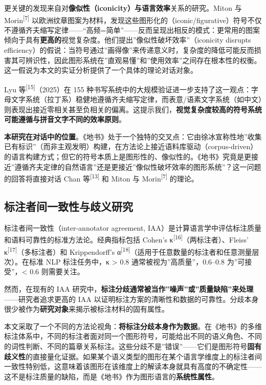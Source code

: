 \documentclass[12pt,a4paper,UTF8,fontset=founder]{ctexart}
\begin{document}
更关键的发现来自对\textbf{像似性（iconicity）与语言效率}关系的研究。Miton 与 Morin\textsuperscript{{[}7{]}} 以欧洲纹章图案为材料，发现这些图形化的（iconic/figurative）符号不仅不遵循齐夫缩写定律------``高频=简单''------反而呈现出相反的模式：更常用的图案倾向于具有\textbf{更高的}视觉复杂度。他们提出''像似性破坏效率''（iconicity disrupts efficiency）的假说：当符号通过''画得像''来传递意义时，复杂度的降低可能反而损害其可辨识性，因此图形系统在''直观易懂''和''使用效率''之间存在根本性的权衡。这一假说为本文的实证分析提供了一个具体的理论对话对象。

Lyu 等\textsuperscript{{[}15{]}}（2025）在 155 种书写系统中的大规模验证进一步支持了这一观点：字母文字系统（拉丁系）稳健地遵循齐夫缩写定律，而表意/语素文字系统（如中文）则表现出接近零相关甚至负相关的偏离。这提示我们，\textbf{视觉复杂度较高的符号系统可能遵循与拼音文字不同的效率原则}。

\textbf{本研究在对话中的位置}。《地书》处于一个独特的交叉点：它由徐冰宣称性地''收集已有标识''（而非主观发明）构建，在方法论上接近语料库驱动（corpus-driven）的语言构建方式；但它的符号本质上是图形性的、像似性的。《地书》究竟是更接近''遵循齐夫定律的自然语言''还是更接近''像似性破坏效率的图形系统''？这一问题的回答将直接对话 Chan 等\textsuperscript{{[}13{]}} 和 Miton 与 Morin\textsuperscript{{[}7{]}} 的理论。

\subsection{标注者间一致性与歧义研究}\label{ux6807ux6ce8ux8005ux95f4ux4e00ux81f4ux6027ux4e0eux6b67ux4e49ux7814ux7a76}

标注者间一致性（inter-annotator agreement, IAA）是计算语言学中评估标注质量和语料可靠性的标准方法论。经典指标包括 Cohen's κ\textsuperscript{{[}16{]}}（两标注者）、Fleiss' κ\textsuperscript{{[}17{]}}（多标注者）和 Krippendorff's α\textsuperscript{{[}18{]}}（适用于任意数量的标注者和任意测量层次）。在标准 NLP 标注任务中，κ \textgreater{} $0.8$ 通常被视为''高质量''，$0.6$--$0.8$ 为''可接受''，\textless{} $0.6$ 则需要关注。

然而，在现有的 IAA 研究中，\textbf{标注分歧通常被当作''噪声''或''质量缺陷''来处理}------研究者追求更高的 IAA 以证明标注方案的清晰性和数据的可靠性。分歧本身很少被作为\textbf{研究对象}来揭示被标注材料的固有属性。

本文采取了一个不同的方法论视角：\textbf{将标注分歧本身作为数据}。在《地书》的多维标注体系中，不同的标注者面对同一个图形符号，可能给出不同的语义角色、不同的词性判断、不同的篇章关系标注。这些分歧不是''错误''------它们是图形符号\textbf{固有歧义性}的直接量化证据。如果某个语义类型的图形在某个语言学维度上的标注者间一致性特别低，这意味着该图形在该维度上的解读本身就具有高度的不确定性------这不是标注质量的缺陷，而是《地书》作为图形语言的\textbf{系统性属性}。
\end{document}

